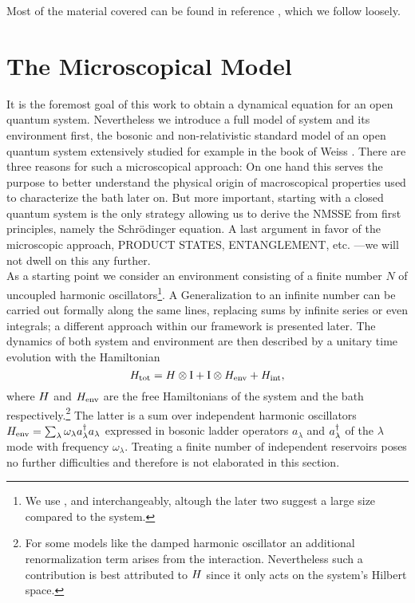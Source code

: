 Most of the material covered can be found in reference \cite{St01_habil}, which we follow loosely.


\section{The Microscopical Model}
\label{sec:nmqsd.model}
%
%

It is the foremost goal of this work to obtain a dynamical equation for an open quantum system.
Nevertheless we introduce a full model of system and its environment first, the bosonic and non-relativistic standard model of an open quantum system extensively studied for example in the book of Weiss \cite{We99_dissipative_systems}.
There are three reasons for such a microscopical approach:
On one hand this serves the purpose to better understand the physical origin of macroscopical properties used to characterize the bath later on.
But more important, starting with a closed quantum system is the only strategy allowing us to derive the NMSSE from first principles, namely the Schrödinger equation.
A last argument in favor of the microscopic approach, PRODUCT STATES, ENTANGLEMENT, etc. ---we will not dwell on this any further.\\

As a starting point we consider an environment consisting of a finite number $N$ of uncoupled harmonic oscillators\footnote{%
  We use ,  and  interchangeably, altough the later two suggest a large size compared to the system.
}.
A Generalization to an infinite number can be carried out formally along the same lines, replacing sums by infinite series or even integrals; a different approach within our framework is presented later.
The dynamics of both system and environment are then described by a unitary time evolution with the Hamiltonian
\begin{equation}
  H_\mathrm{tot} = H \otimes \mathrm{I}  +  \mathrm{I} \otimes H_\mathrm{env}  +  H_\mathrm{int},
  \label{eq:nmqsd.Htot}
\end{equation}
where $H$ and $H_\mathrm{env}$ are the free Hamiltonians of the system and the bath respectively.\footnote{%
  For some models like the damped harmonic oscillator \cite{CaLe83_diss_system} an additional renormalization term arises from the interaction.
  Nevertheless such a contribution is best attributed to $H$ since it only acts on the system's Hilbert space.
}
The latter is a sum over independent harmonic oscillators $H_\mathrm{env} = \sum_\lambda \omega_\lambda a^\dagger_\lambda a_\lambda$ expressed in bosonic ladder operators $a_\lambda$ and $a^\dagger_\lambda$ of the $\lambda$\th mode with frequency $\omega_\lambda$.
Treating a finite number of independent reservoirs poses no further difficulties and therefore is not elaborated in this section.

